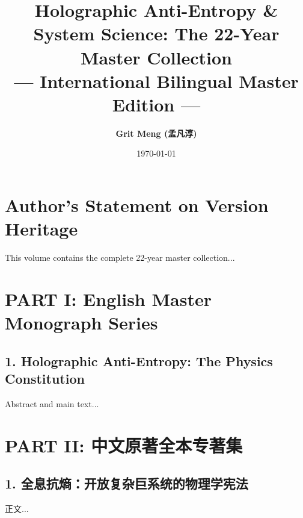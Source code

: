 \documentclass[11pt,a4paper]{article}
\title{\textbf{Holographic Anti-Entropy \& System Science: The 22-Year Master Collection}\\ \large — International Bilingual Master Edition —}
\author{\textbf{Grit Meng (孟凡淳)}}
\date{\today}
\begin{document}
\maketitle

\section*{Author's Statement on Version Heritage}
This volume contains the complete 22-year master collection...

\section*{PART I: English Master Monograph Series}
\subsection*{1. Holographic Anti-Entropy: The Physics Constitution}
Abstract and main text...

\section*{PART II: 中文原著全本专著集}
\subsection*{1. 全息抗熵：开放复杂巨系统的物理学宪法}
正文...
\end{document}
